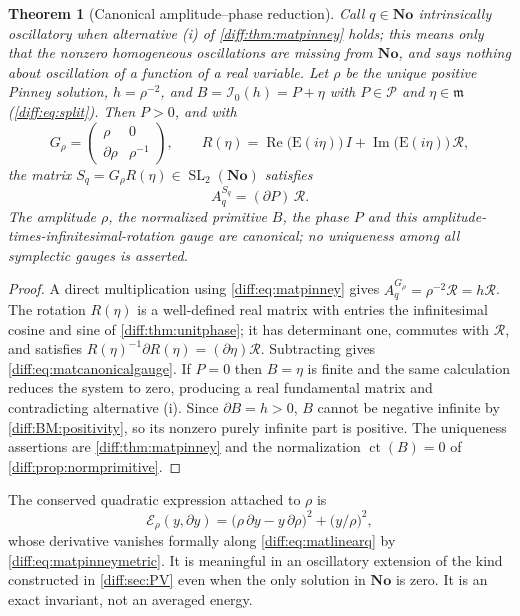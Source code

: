\documentclass[11pt,letterpaper]{article}
\numberwithin{equation}{section}
\newtheorem{theorem}{Theorem}[section]
\theoremstyle{definition}
\theoremstyle{remark}
\newcommand{\No}{\mathbf{No}}
\newcommand{\der}{\partial}
\newcommand{\mm}{\mathfrak m}
\newcommand{\Pcl}{\mathcal P}
\newcommand{\Izero}{\mathcal I_{0}}
\newcommand{\ct}{\operatorname{ct}}
\newcommand{\Ree}{\operatorname{Re}}
\newcommand{\Imm}{\operatorname{Im}}
\newcommand{\Emm}{\mathrm{E}}
\newcommand{\SL}{\operatorname{SL}}
\newcommand{\Rot}{\mathcal R}
\begin{document}
\begin{theorem}[Canonical amplitude--phase reduction]
\label{diff:thm:matamplitude}
Call $q\in\No$ \emph{intrinsically oscillatory} when alternative (i) of
\cref{diff:thm:matpinney} holds; this means only that the nonzero homogeneous
oscillations are missing from $\No$, and says nothing about oscillation of a
function of a real variable. Let $\rho$ be the unique positive Pinney
solution, $h=\rho^{-2}$, and $B=\Izero(h)=P+\eta$ with $P\in\Pcl$ and
$\eta\in\mm$ (\cref{diff:eq:split}). Then $P>0$, and with
\[
 G_{\rho}=\begin{pmatrix}\rho&0\\ \der\rho&\rho^{-1}\end{pmatrix},
 \qquad
 R(\eta)=\Ree\bigl(\Emm(i\eta)\bigr)\,I+\Imm\bigl(\Emm(i\eta)\bigr)\,\Rot ,
\]
the matrix $S_{q}=G_{\rho}R(\eta)\in\SL_{2}(\No)$ satisfies
\begin{equation}\label{diff:eq:matcanonicalgauge}
 A_{q}^{S_{q}}=(\der P)\,\Rot .
\end{equation}
The amplitude $\rho$, the normalized primitive $B$, the phase $P$ and this
amplitude-times-infinitesimal-rotation gauge are canonical; no uniqueness
among all symplectic gauges is asserted.
\end{theorem}
\begin{proof}
A direct multiplication using \cref{diff:eq:matpinney} gives
$A_{q}^{G_{\rho}}=\rho^{-2}\Rot=h\Rot$. The rotation $R(\eta)$ is a
well-defined real matrix with entries the infinitesimal cosine and sine of
\cref{diff:thm:unitphase}; it has determinant one, commutes with $\Rot$, and
satisfies $R(\eta)^{-1}\der R(\eta)=(\der\eta)\Rot$. Subtracting gives
\cref{diff:eq:matcanonicalgauge}. If $P=0$ then $B=\eta$ is finite and the same
calculation reduces the system to zero, producing a real fundamental matrix
and contradicting alternative (i). Since $\der B=h>0$, $B$ cannot be negative
infinite by \ref{diff:BM:positivity}, so its nonzero purely infinite part is
positive. The uniqueness assertions are \cref{diff:thm:matpinney} and the
normalization $\ct(B)=0$ of \cref{diff:prop:normprimitive}.
\end{proof}

The conserved quadratic expression attached to $\rho$ is
\begin{equation}\label{diff:eq:matlewis}
 \mathcal E_{\rho}(y,\der y)
  =\bigl(\rho\,\der y-y\,\der\rho\bigr)^{2}+\bigl(y/\rho\bigr)^{2},
\end{equation}
whose derivative vanishes formally along \cref{diff:eq:matlinearq} by
\cref{diff:eq:matpinneymetric}. It is meaningful in an oscillatory extension
of the kind constructed in \cref{diff:sec:PV} even when the only solution in
$\No$ is zero. It is an exact invariant, not an averaged energy.
\end{document}
